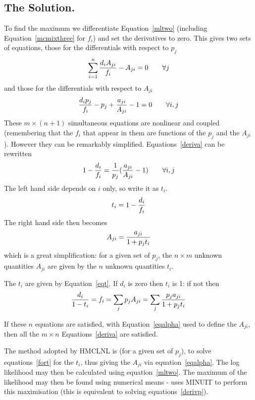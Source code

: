 \begin{changebar}
\subsection*{The Solution.}
 
To find the maximum we differentiate Equation~\ref{mltwo} (including
Equation~\ref{mcmixthree} for $f_i$) and set the
derivatives to zero.   This gives two sets of equations,
those for the differentials with respect to $p_j$
\begin{equation}
\sum_{i=1}^n {d_i A_{ji} \over f_i} - A_{ji}=0\qquad \forall j
\label{derivp}
\end{equation}
and those for the differentials with respect to $A_{ji}$
\begin{equation}
{d_i p_j \over f_i} - p_j
+ {a_{ji} \over A_{ji}} -1
=0\qquad \forall i,j \label{deriva}
\end{equation}
These $m \times (n+1)$ simultaneous equations are
nonlinear and coupled (remembering that the $f_i$ that appear
in them are functions
of the $p_j$ and the $A_{ji}$).  However they can be remarkably simplified.
Equations~\ref{deriva} can be rewritten
\begin{equation}
1-{d_i \over f_i}  ={1 \over p_j}({a_{ji} \over A_{ji}}-1)
\qquad \forall i,j
\label{separate}
\end{equation}
The left hand side depends on $i$ only, so
write it as $t_i$.
\begin{equation}
t_i = 1-{d_i \over f_i} \label{eqt}
\end{equation}
The right hand side then becomes
\begin{equation}
A_{ji} = {a_{ji} \over 1 + p_j t_i} \label{eqalpha}
\end{equation}
which is a great simplification: for a given set of $p_j$,
the $n\times m$ unknown
quantities $A_{ji}$ are given by the $n$ unknown quantities
$t_i$.
 
The $t_i$ are given by Equation~\ref{eqt}. If $d_i$ is zero
then $t_i$ is 1: if not then
\begin{equation}
{d_i \over 1 - t_i} = f_i = \sum_j p_j A_{ji} = \sum_j {p_j a_{ji}
\over 1 + p_j t_i} \label{fort}
\end{equation}
 
If these $n$ equations are satisfied, with Equation~\ref{eqalpha}
used to define the $A_{ji}$, then all the $m \times n$
Equations~\ref{deriva} are satisfied.
 
 
The method adopted by HMCLNL is (for a given set of $p_j$), to solve
equations~\ref{fort} for the $t_i$, thus giving the $A_{ji}$ via
equation~\ref{eqalpha}.  The log likelihood may then be calculated using
equation~\ref{mltwo}.  The maximum of the likelihood may then be found
using numerical means -  uses MINUIT to perform this maximisation
(this is equivalent to solving equations~\ref{derivp}).
 

\end{changebar}
